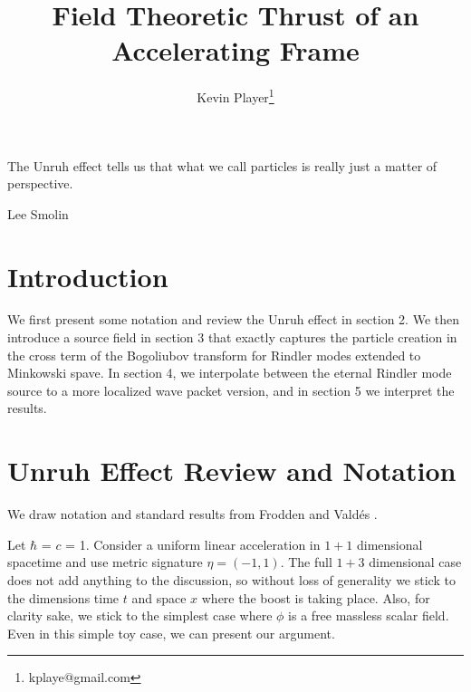 \documentclass[12pt,a4paper]{article}
\begin{document}
\title{Field Theoretic Thrust of an Accelerating Frame}
\author[1]{Kevin Player\footnote{kplaye@gmail.com}}

\maketitle

\epigraph{The Unruh effect tells us that what we call particles is really just a matter of perspective.}{Lee Smolin}


\section{Introduction}
We first present some notation and review the Unruh effect in section 2.  We then introduce a source field in section 3 that exactly captures the particle creation in the cross term of the Bogoliubov transform for Rindler modes extended to Minkowski spave.  In section 4,  we interpolate between the eternal Rindler mode source to a more localized wave packet version, and in section 5 we interpret the results.

\section{Unruh Effect Review and Notation}

We draw notation and standard results from Frodden and Vald{\'{e}}s \cite{Frodden}.

Let $\hbar$ = $c$ = 1. Consider a uniform linear acceleration in $1+1$ dimensional spacetime and use metric signature $\eta = (-1,1)$. The full $1+3$ dimensional case does not add anything to the discussion, so without loss of generality we stick to the dimensions time $t$ and space $x$ where the boost is taking place.  Also, for clarity sake, we stick to the simplest case where $\phi$ is a free massless scalar field.  Even in this simple toy case, we can present our argument.
\end{document}
